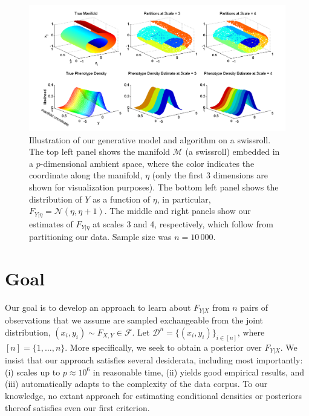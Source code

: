 \documentclass{article} %
\providecommand{\mc}[1]{\mathcal{#1}}
\begin{document}
\begin{figure}[htbp]
	\centering
		\includegraphics[width=1\linewidth]{../figs/PartitionsDensity_27MAY}
	\caption{Illustration of our generative model and algorithm on a swissroll. The top left panel shows the manifold $\mc{M}$ (a swissroll) embedded in a $p$-dimensional ambient space, where the color indicates the coordinate along the manifold, $\eta$ (only the first 3 dimensions are shown for visualization purposes). The bottom left panel shows the distribution of $Y$ as a function of $\eta$, in particular, $F_{Y|\eta}=\mc{N}({\eta},{\eta}+1)$. The middle and right panels show our estimates of $F_{Y|{\eta}}$ at scales 3 and 4, respectively, which follow from partitioning our data.  Sample size was $n=10\,000$.}
	\label{fig:swiss}
\end{figure}


\section{Goal} \label{sec:goal}

Our goal is to develop an approach to learn about $F_{Y|X}$ from $n$ pairs of observations that we assume are sampled exchangeable from the joint distribution, $(x_i,y_i) \sim F_{X,Y} \in \mc{F}$. Let $\mc{D}^n=\{(x_i,y_i)\}_{i \in [n]}$, where $[n]=\{1,\ldots, n\}$.  More specifically, we seek to obtain a posterior over $F_{Y|X}$.  We insist that our approach satisfies several desiderata, including most importantly: (i) scales up to $p \approx 10^6$ in reasonable time,  (ii) yields good empirical results, and (iii) automatically adapts to the complexity of the data corpus.  To our knowledge, no extant approach for estimating conditional densities or posteriors thereof satisfies even our first criterion. 
\end{document}
